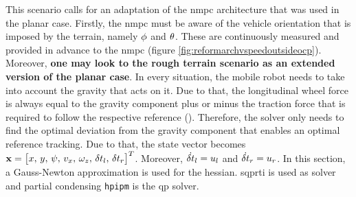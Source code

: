 This scenario calls for an adaptation of the \acrshort{nmpc} architecture that was used in the planar case. Firstly, the \acrshort{nmpc} must be aware of the vehicle orientation that is imposed by the terrain, namely $\phi$ and $\theta$. These are continuously measured and provided in advance to the \acrshort{nmpc} (figure \ref{fig:reformarchvspeedoutsideocp}). Moreover, \textbf{one may look to the rough terrain scenario as an extended version of the planar case}. In every situation, the mobile robot needs to take into account the gravity that acts on it. Due to that, the longitudinal wheel force is always equal to the gravity component plus or minus the traction force that is required to follow the respective reference (). Therefore, the solver only needs to find the optimal deviation from the gravity component that enables an optimal reference tracking. Due to that, the state vector becomes $\mathbf{x} = \begin{bmatrix}x,\,y,\,\psi,\,v_x,\,\omega_z,\,\delta t_l,\,\delta t_r\end{bmatrix}^T$. Moreover, $\dot{\delta t}_l = u_l$ and $\dot{\delta t}_r = u_r$. In this section, a Gauss-Newton approximation is used for the hessian. \acrshort{sqprti} is used as solver and partial condensing \texttt{\acrshort{hpipm}} is the \acrshort{qp} solver.

